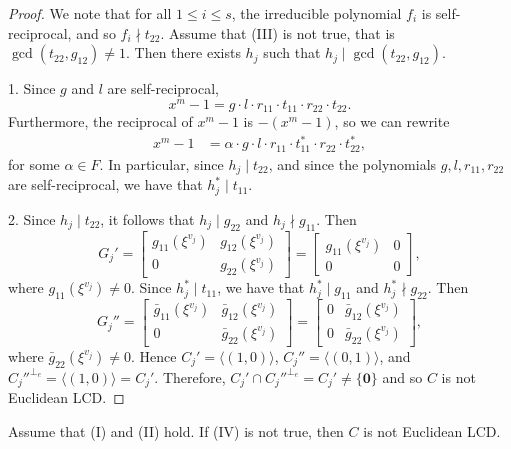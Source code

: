 \documentclass[a4paper,12pt]{article}
\begin{document}
\begin{proof} We note that for all $1 \le i \le s$, the irreducible polynomial $f_i$ is self-reciprocal, and so $f_i \nmid t_{22}$.  
Assume that (III) is not true, that is $\gcd(t_{22},g_{12}) \ne 1$. Then there exists $h_j$ such that $h_j \mid \gcd(t_{22},g_{12})$.   


1. Since  $g$ and $l$ are self-reciprocal, 
\[
x^m-1  = g \cdot l \cdot r_{11} \cdot t_{11} \cdot r_{22} \cdot t_{22}.  
\] 
Furthermore, the  reciprocal of  $x^m-1$ is  $-(x^m-1)$, so we can rewrite 
\begin{align*}
x^m-1   &= \alpha \cdot g \cdot l \cdot r_{11} \cdot t_{11}^*    \cdot  r_{22} \cdot  t_{22}^*,
\end{align*} 
for some $\alpha 
\in F$. In particular, since  $h_j \mid t_{22}$, and since the polynomials $g,l,r_{11},r_{22}$ are self-reciprocal, we have that $h_j^* \mid t_{11}$.


 



2. Since $h_j \mid t_{22}$, it follows that $h_j \mid g_{22}$ and $h_j \nmid g_{11}$.  Then  
\[
G_j'=\begin{bmatrix}
g_{11}(\xi^{v_j}) & g_{12}(\xi^{v_j}) \\
0 & g_{22}(\xi^{v_j}) 
\end{bmatrix} = \begin{bmatrix}
g_{11}(\xi^{v_j}) & 0 \\
0 & 0 
\end{bmatrix},
\]
where $g_{11}(\xi^{v_j}) \ne 0$.
Since $h_j^* \mid t_{11}$, we have that $h_j^* \mid g_{11}$ and $h_j^* \nmid g_{22}$. Then 
\[
G_j'' = \begin{bmatrix}
	\bar{g}_{11}(\xi^{v_j}) & \bar{g}_{12}(\xi^{v_j}) \\
	0 & \bar{g}_{22}(\xi^{v_j}) 
\end{bmatrix} = \begin{bmatrix}
 	0 &  \bar{g}_{12}(\xi^{v_j}) \\
	0 & \bar{g}_{22}(\xi^{v_j}) 
\end{bmatrix},
\]
where $\bar{g}_{22}(\xi^{v_j}) \ne 0$. Hence  $C_j' =\langle (1,0) \rangle$, $C_j'' =\langle (0,1) \rangle$, and $C_j''^{\perp_e} =\langle (1,0) \rangle = C_j'$.
Therefore, $C_j' \cap {C_j''}^{\perp_e}=C_j' \ne \{\mathbf{0}\}$ and so $C$ is not Euclidean LCD.
\end{proof}


\begin{lemma}   \label{nIV}  Assume that (I) and (II) hold. If (IV) is not true, then $C$ is not Euclidean LCD. 
\end{lemma}
\end{document}

